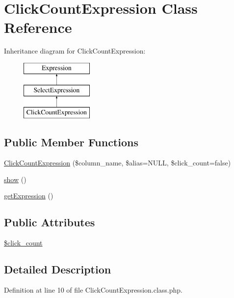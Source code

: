 \hypertarget{classClickCountExpression}{\section{Click\-Count\-Expression Class Reference}
\label{classClickCountExpression}
}
Inheritance diagram for Click\-Count\-Expression\-:\begin{figure}[H]
\begin{center}
\leavevmode
\includegraphics[height=3.000000cm]{classClickCountExpression}
\end{center}
\end{figure}
\subsection*{Public Member Functions}
\begin{DoxyCompactItemize}
\item 
\hyperlink{classClickCountExpression_afc3cb0cccfbcad19bf50ef591d77318b}{Click\-Count\-Expression} (\$column\-\_\-name, \$alias=N\-U\-L\-L, \$click\-\_\-count=false)
\item 
\hyperlink{classClickCountExpression_a19b7767f37c3dd3461db66b741ff83f6}{show} ()
\item 
\hyperlink{classClickCountExpression_acd86ecac8f6416d56024e241ba115473}{get\-Expression} ()
\end{DoxyCompactItemize}
\subsection*{Public Attributes}
\begin{DoxyCompactItemize}
\item 
\hyperlink{classClickCountExpression_ae2f2beae2bcbb1e22dac9f84853a1226}{\$click\-\_\-count}
\end{DoxyCompactItemize}


\subsection{Detailed Description}


Definition at line 10 of file Click\-Count\-Expression.\-class.\-php.



